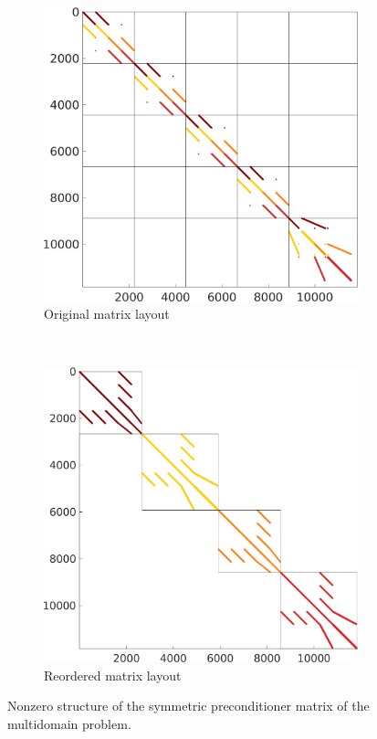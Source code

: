 \begin{figure}%
  \centering%
  \begin{subfigure}[t]{0.49\textwidth}%
    \centering%
    \includegraphics[width=\textwidth]{images/implementation/original_diagonal_matrix.png}
    \caption{Original matrix layout}%
    \label{fig:original_diagonal_matrix}%
  \end{subfigure}
  \,
  \begin{subfigure}[t]{0.49\textwidth}%
    \centering%
    \includegraphics[width=\textwidth]{images/implementation/reordered_diagonal_matrix.png}
    \caption{Reordered matrix layout}%
    \label{fig:reordered_diagonal_matrix}%
  \end{subfigure}
  \caption{Nonzero structure of the symmetric preconditioner matrix of the multidomain problem.}%
  \label{fig:original_reordered_diagonal_matrix}%
\end{figure}%

